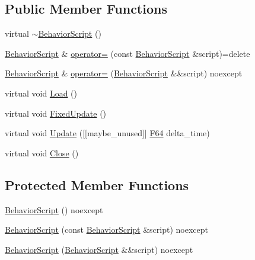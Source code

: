 \subsection*{Public Member Functions}
\begin{DoxyCompactItemize}
\item 
virtual \hyperlink{classmage_1_1_behavior_script_a61e4825ba0fc7746d49faa44ed7bc481}{$\sim$\+Behavior\+Script} ()
\item 
\hyperlink{classmage_1_1_behavior_script}{Behavior\+Script} \& \hyperlink{classmage_1_1_behavior_script_a0b3327ebf7009e668a7022d254cb1d51}{operator=} (const \hyperlink{classmage_1_1_behavior_script}{Behavior\+Script} \&script)=delete
\item 
\hyperlink{classmage_1_1_behavior_script}{Behavior\+Script} \& \hyperlink{classmage_1_1_behavior_script_aefeae227ee8d2452bf05782604f5011e}{operator=} (\hyperlink{classmage_1_1_behavior_script}{Behavior\+Script} \&\&script) noexcept
\item 
virtual void \hyperlink{classmage_1_1_behavior_script_a06521eef472f2d878a9f652b95b723a8}{Load} ()
\item 
virtual void \hyperlink{classmage_1_1_behavior_script_a8318f79ab78798ec37b39bc844f7138c}{Fixed\+Update} ()
\item 
virtual void \hyperlink{classmage_1_1_behavior_script_afb9cf3759edf8876416d1df85489cba6}{Update} (\mbox{[}\mbox{[}maybe\+\_\+unused\mbox{]}\mbox{]} \hyperlink{namespacemage_ad26233bbec640deda836e572c1a23708}{F64} delta\+\_\+time)
\item 
virtual void \hyperlink{classmage_1_1_behavior_script_aaf2b9f6666064f5b6a6e21b7f1623584}{Close} ()
\end{DoxyCompactItemize}
\subsection*{Protected Member Functions}
\begin{DoxyCompactItemize}
\item 
\hyperlink{classmage_1_1_behavior_script_adbe64d10ebd511f05af9e0930e245913}{Behavior\+Script} () noexcept
\item 
\hyperlink{classmage_1_1_behavior_script_a0f3baaa9549ab272f0711c06d33ad223}{Behavior\+Script} (const \hyperlink{classmage_1_1_behavior_script}{Behavior\+Script} \&script) noexcept
\item 
\hyperlink{classmage_1_1_behavior_script_abae69e797a05fa2cd1c3b7704f1c6767}{Behavior\+Script} (\hyperlink{classmage_1_1_behavior_script}{Behavior\+Script} \&\&script) noexcept
\end{DoxyCompactItemize}


